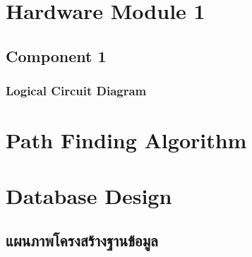 \documentclass[12pt,oneside,openright,a4paper]{cpe-thai-project}
\begin{document}
\section{Hardware Module 1}
    \subsection{Component 1}
        \subsubsection{Logical Circuit Diagram} %

\section{Path Finding Algorithm}

\section{Database Design}
    \subsection{แผนภาพโครงสร้างฐานข้อมูล}
\end{document}
